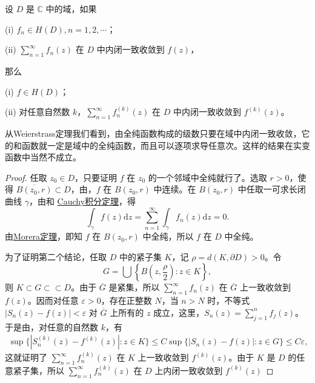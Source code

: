 \documentclass[../../main.tex]{subfiles}
\begin{document}
\begin{theorem}[Weierstrass定理]\label{theorem:Weierstrass定理}
设 \( D \) 是 \( \mathbb{C} \) 中的域，如果

(i) \( f_n \in H(D), n = 1, 2, \cdots \)；

(ii) \( \sum_{n=1}^{\infty} f_n(z) \) 在 \( D \) 中内闭一致收敛到 \( f(z) \)，

那么

(i) \( f \in H(D) \)；

(ii) 对任意自然数 \( k \)，\( \sum_{n=1}^{\infty} f_n^{(k)}(z) \) 在 \( D \) 中内闭一致收敛到 \( f^{(k)}(z) \)。
\end{theorem}
\begin{note}
从Weierstrass定理我们看到，由全纯函数构成的级数只要在域中内闭一致收敛，它的和函数就一定是域中的全纯函数，而且可以逐项求导任意次。这样的结果在实变函数中当然不成立。
\end{note}
\begin{proof}
任取 \( z_0 \in D \)，只要证明 \( f \) 在 \( z_0 \) 的一个邻域中全纯就行了。选取 \( r > 0 \)，使得 \( \overline{B(z_0, r)} \subset D \)，由，\( f \) 在 \( B(z_0, r) \) 中连续。在 \( B(z_0, r) \) 中任取一可求长闭曲线 \( \gamma \)，由和 \hyperref[theorem:Cauchy-Goursat定理(Cauchy积分定理)]{Cauchy积分定理}，得
\[
\int_{\gamma} f(z) \mathrm{d}z = \sum_{n=1}^{\infty} \int_{\gamma} f_n(z) \mathrm{d}z = 0.
\]
由\hyperref[theorem:Morera定理]{Morera定理}，即知 \( f \) 在 \( B(z_0, r) \) 中全纯，所以 \( f \) 在 \( D \) 中全纯。

为了证明第二个结论，任取 \( D \) 中的紧子集 \( K \)，记 \( \rho = d(K, \partial D) > 0 \)。令
\[
G = \bigcup\left\{ B\left(z, \frac{\rho}{2}\right) : z \in K \right\},
\]
则 \( K \subset G \subset\subset D \)。由于 \( \overline{G} \) 是紧集，所以 \( \sum_{n=1}^{\infty} f_n(z) \) 在 \( \overline{G} \) 上一致收敛到 \( f(z) \)。因而对任意 \( \varepsilon > 0 \)，存在正整数 \( N \)，当 \( n > N \) 时，不等式 \( |S_n(z) - f(z)| < \varepsilon \) 对 \( \overline{G} \) 上所有的 \( z \) 成立，这里，\( S_n(z) = \sum_{j=1}^{n} f_j(z) \)。于是由，对任意的自然数 \( k \)，有
\begin{align*}
\sup\{|S_n^{(k)}(z) - f^{(k)}(z)| : z \in K\} \leqslant C\sup\{|S_n(z) - f(z)| : z \in G\} \leqslant C\varepsilon,
\end{align*}
这就证明了 \( \sum_{n=1}^{\infty} f_n^{(k)}(z) \) 在 \( K \) 上一致收敛到 \( f^{(k)}(z) \)。由于 \( K \) 是 \( D \) 的任意紧子集，所以 \( \sum_{n=1}^{\infty} f_n^{(k)}(z) \) 在 \( D \) 上内闭一致收敛到 \( f^{(k)}(z) \)

\end{proof}
\end{document}
